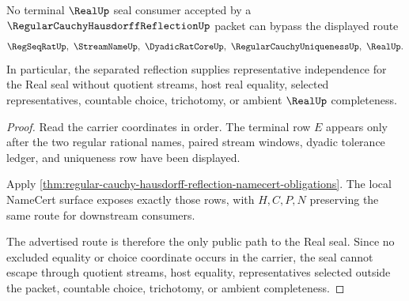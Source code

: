 \begin{theorem}
\label{thm:regular-cauchy-hausdorff-reflection-real-seal-nonescape}
No terminal $\RealUp$ seal consumer accepted by a $\RegularCauchyHausdorffReflectionUp$ packet can bypass the displayed route
$$
\RegSeqRatUp,\ \StreamNameUp,\ \DyadicRatCoreUp,\ \RegularCauchyUniquenessUp,\ \RealUp .
$$
In particular, the separated reflection supplies representative independence for the Real seal without quotient streams, host real equality, selected representatives, countable choice, trichotomy, or ambient $\RealUp$ completeness.
\end{theorem}
\begin{proof}
Read the carrier coordinates in order. The terminal row $E$ appears only after the two regular rational names, paired stream windows, dyadic tolerance ledger, and uniqueness row have been displayed.

Apply \autoref{thm:regular-cauchy-hausdorff-reflection-namecert-obligations}. The local NameCert surface exposes exactly those rows, with $H,C,P,N$ preserving the same route for downstream consumers.

The advertised route is therefore the only public path to the Real seal. Since no excluded equality or choice coordinate occurs in the carrier, the seal cannot escape through quotient streams, host equality, representatives selected outside the packet, countable choice, trichotomy, or ambient completeness.
\end{proof}

